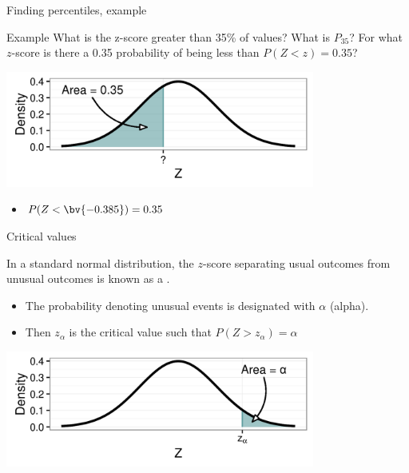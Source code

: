 \documentclass[xcolor=table, handout]{beamer}
\begin{document}
\begin{frame}{Finding percentiles, example}
\begin{exampleblock}{Example}
What is the z-score greater than 35\% of values? What is $P_{35}$? For what $z$-score is there a 0.35 probability of being less than $P(Z < z) = 0.35$?\\
\smallskip
{\centering
\includegraphics[width=4in]{../images/ch6_ex04}
\par}

\begin{itemize}
\pause\item $P(Z < \bv{-0.385}) = 0.35$
\end{itemize}
\end{exampleblock}
\end{frame}

\begin{frame}{Critical values}
\begin{block}{}
{\large In a standard normal distribution, the $z$-score separating usual outcomes from unusual outcomes is known as a .}
\begin{itemize}
\item The probability denoting unusual events is designated with $\alpha$ (alpha).
\item Then $z_\alpha$ is the critical value such that $P(Z > z_\alpha) = \alpha$
\end{itemize}
\end{block}

\medskip
{\centering
\includegraphics[width=4in]{../images/ch6_alpha}
\par}

\end{frame}
\end{document}
